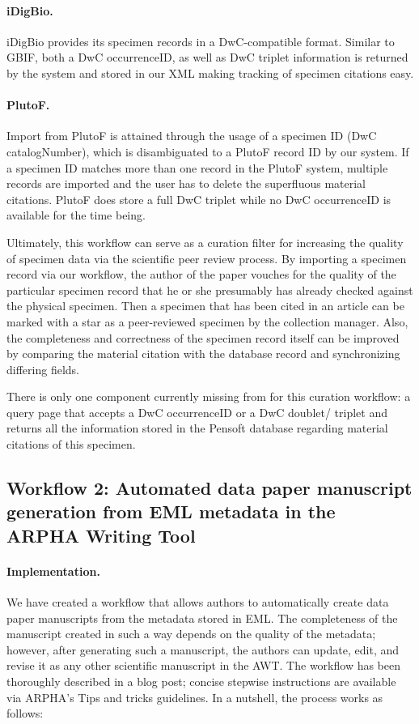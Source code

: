 \paragraph{iDigBio.} iDigBio provides its specimen records in a DwC-compatible format. Similar to GBIF, both a DwC occurrenceID, as well as DwC triplet information is returned by the system and stored in our XML making tracking of specimen citations easy.

\paragraph{PlutoF.} Import from PlutoF is attained through the usage of a specimen ID (DwC catalogNumber), which is disambiguated to a PlutoF record ID by our system. If a specimen ID matches more than one record in the PlutoF system, multiple records are imported and the user has to delete the superfluous material citations. PlutoF does store a full DwC triplet while no DwC occurrenceID is available for the time being.

Ultimately, this workflow can serve as a curation filter for increasing the quality of specimen data via the scientific peer review process. By importing a specimen record via our workflow, the author of the paper vouches for the quality of the particular specimen record that he or she presumably has already checked against the physical specimen. Then a specimen that has been cited in an article can be marked with a star as a peer-reviewed specimen by the collection manager. Also, the completeness and correctness of the specimen record itself can be improved by comparing the material citation with the database record and synchronizing differing fields.

There is only one component currently missing from for this curation workflow: a query page that accepts a DwC occurrenceID or a DwC doublet/ triplet and returns all the information stored in the Pensoft database regarding material citations of this specimen.

\subsection{Workflow 2: Automated data paper manuscript generation from EML metadata in the ARPHA Writing Tool}

\paragraph{Implementation.} We have created a workflow that allows authors to automatically create data paper manuscripts from the metadata stored in EML. The completeness of the manuscript created in such a way depends on the quality of the metadata; however, after generating such a manuscript, the authors can update, edit, and revise it as any other scientific manuscript in the AWT. The workflow has been thoroughly described in a blog post; concise stepwise instructions are available via ARPHA's Tips and tricks guidelines. In a nutshell, the process works as follows:

